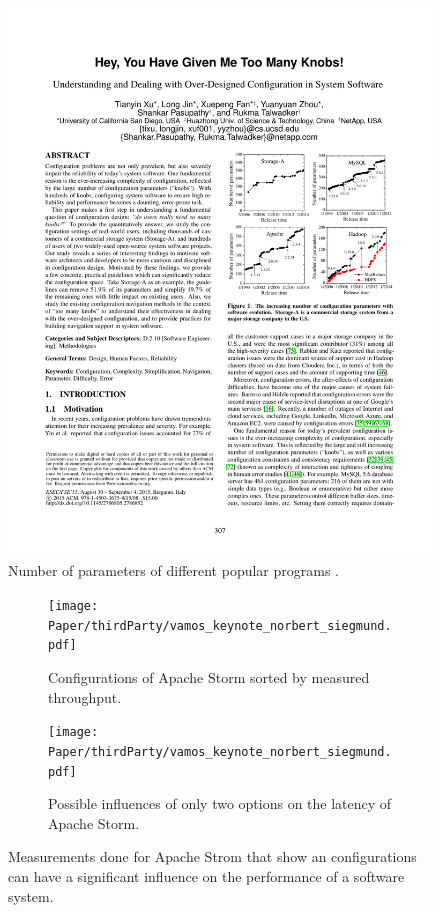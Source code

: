 \begin{figure}[h]
	\centering
	\includegraphics[clip,trim= 11cm 13cm 2cm 7cm]{Paper/thirdParty/HeyYouHaveGivenMeTooManyKnobs.pdf}
	\caption{Number of parameters of different popular programs \cite{YouveGivenMeTooManyKnobs}.}
	\label{fig:paramters}
\end{figure}\noindent
\begin{figure}[h]\noindent
	\begin{subfigure}{.45\linewidth}
		\centering
		\texttt{[image: Paper/thirdParty/vamos\_keynote\_norbert\_siegmund.pdf]}
		\caption{Configurations of Apache Storm sorted by measured throughput.}
	\end{subfigure}\hspace{.1\linewidth}
	\begin{subfigure}{.45\linewidth}
		\centering
		\texttt{[image: Paper/thirdParty/vamos\_keynote\_norbert\_siegmund.pdf]}
		\caption{Possible influences of only two options on the latency of Apache Storm. }
	\end{subfigure}
	\caption{Measurements done for Apache Strom that show an configurations can have a significant influence on the performance of a software system.}
	\label{fig:ApacheStorm}
\end{figure}


